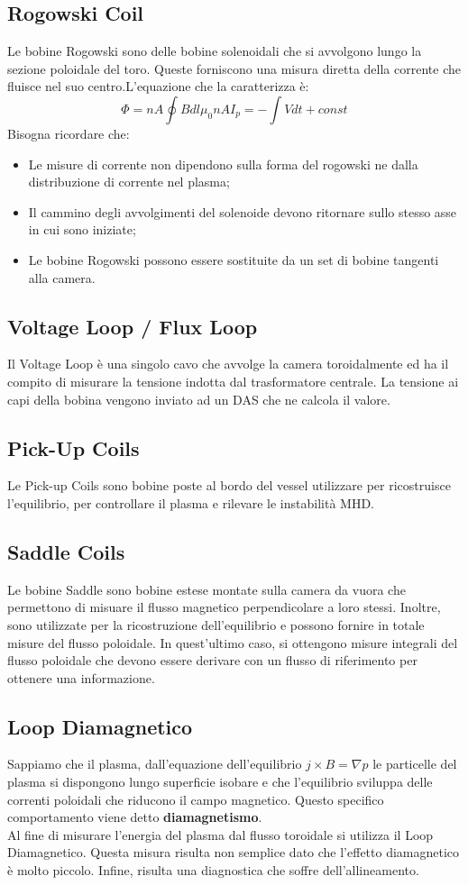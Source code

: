 \documentclass{article}
\begin{document}
\subsection{Rogowski Coil}
Le bobine Rogowski sono delle bobine solenoidali che si avvolgono lungo la sezione poloidale del toro. Queste forniscono una misura diretta della corrente che fluisce nel suo centro.\newline L'equazione che la caratterizza è:\begin{equation}
	\Phi = nA \oint B dl \mu_{0}nAI_p=-\int V dt+const
\end{equation}
Bisogna ricordare che:
\begin{itemize}
	\item Le misure di corrente non dipendono sulla forma del rogowski ne dalla distribuzione di corrente nel plasma;
	\item Il cammino degli avvolgimenti del solenoide devono ritornare sullo stesso asse in cui sono iniziate;
	\item Le bobine Rogowski possono essere sostituite da un set di bobine tangenti alla camera.
\end{itemize}
\subsection{Voltage Loop / Flux Loop}
Il Voltage Loop è una singolo cavo che avvolge la camera toroidalmente ed ha il compito di misurare la tensione indotta dal trasformatore centrale. La tensione ai capi della bobina vengono inviato ad un DAS che ne calcola il valore.
\subsection{Pick-Up Coils}
Le Pick-up Coils sono bobine poste al bordo del vessel utilizzare per ricostruisce l'equilibrio, per controllare il plasma e rilevare le instabilità MHD.%
\subsection{Saddle Coils}
Le bobine Saddle sono bobine estese montate sulla camera da vuora che permettono di misuare il flusso magnetico perpendicolare a loro stessi. Inoltre, sono utilizzate per la ricostruzione dell'equilibrio e possono fornire in totale misure del flusso poloidale. In quest'ultimo caso, si ottengono misure integrali del flusso poloidale che devono essere derivare con un flusso di riferimento per ottenere una informazione.
\subsection{Loop Diamagnetico}
Sappiamo che il plasma, dall'equazione dell'equilibrio \(j\times B=\nabla p\) le particelle del plasma si dispongono lungo superficie isobare e che l'equilibrio sviluppa delle correnti poloidali che riducono il campo magnetico. Questo specifico comportamento viene detto \textbf{diamagnetismo}.\\
Al fine di misurare l'energia del plasma dal flusso toroidale si utilizza il Loop Diamagnetico. Questa misura risulta non semplice dato che l'effetto diamagnetico è molto piccolo.\newline
Infine, risulta una diagnostica che soffre dell'allineamento.
\end{document}

